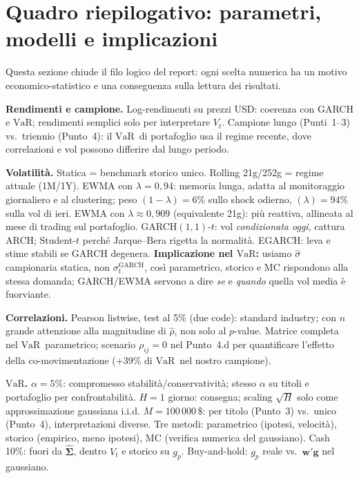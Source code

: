 \documentclass[12pt,a4paper]{article}
\newcommand{\VaR}{\ensuremath{\mathrm{VaR}}}
\newcommand{\USD}{\ensuremath{\,\$}}
\begin{document}
\section{Quadro riepilogativo: parametri, modelli e implicazioni}

Questa sezione chiude il filo logico del report: ogni scelta numerica ha un motivo economico-statistico e una conseguenza sulla lettura dei risultati.

\textbf{Rendimenti e campione.} Log-rendimenti su prezzi USD: coerenza con GARCH e \VaR; rendimenti semplici solo per interpretare $V_t$. Campione lungo (Punti~1--3) vs.\ triennio (Punto~4): il \VaR\ di portafoglio usa il regime recente, dove correlazioni e vol possono differire dal lungo periodo.

\textbf{Volatilità.} Statica = benchmark storico unico. Rolling 21g/252g = regime attuale (1M/1Y). EWMA con $\lambda=0{,}94$: memoria lunga, adatta al monitoraggio giornaliero e al clustering; peso $(1-\lambda)=6\%$ sullo shock odierno, $(\lambda)=94\%$ sulla vol di ieri. EWMA con $\lambda\approx 0{,}909$ (equivalente 21g): più reattiva, allineata al mese di trading sul portafoglio. GARCH$(1,1)$-$t$: vol \emph{condizionata oggi}, cattura ARCH; Student-$t$ perché Jarque--Bera rigetta la normalità. EGARCH: leva e stime stabili se GARCH degenera. \textbf{Implicazione nel \VaR:} usiamo $\hat\sigma$ campionaria statica, non $\sigma_t^{\mathrm{GARCH}}$, così parametrico, storico e MC rispondono alla stessa domanda; GARCH/EWMA servono a dire \emph{se} e \emph{quando} quella vol media è fuorviante.

\textbf{Correlazioni.} Pearson listwise, test al 5\% (due code): standard industry; con $n$ grande attenzione alla magnitudine di $\hat\rho$, non solo al $p$-value. Matrice completa nel \VaR\ parametrico; scenario $\rho_{ij}=0$ nel Punto~4.d per quantificare l'effetto della co-movimentazione (+39\% di \VaR\ nel nostro campione).

\textbf{\VaR.} $\alpha=5\%$: compromesso stabilità/conservatività; stesso $\alpha$ su titoli e portafoglio per confrontabilità. $H=1$ giorno: consegna; scaling $\sqrt{H}$ solo come approssimazione gaussiana i.i.d. $M=100\,000\USD$: per titolo (Punto~3) vs.\ unico (Punto~4), interpretazioni diverse. Tre metodi: parametrico (ipotesi, velocità), storico (empirico, meno ipotesi), MC (verifica numerica del gaussiano). Cash 10\%: fuori da $\hat{\boldsymbol\Sigma}$, dentro $V_t$ e storico su $g_p$. Buy-and-hold: $g_p$ reale vs.\ $\mathbf{w}'\mathbf{g}$ nel gaussiano.
\end{document}
